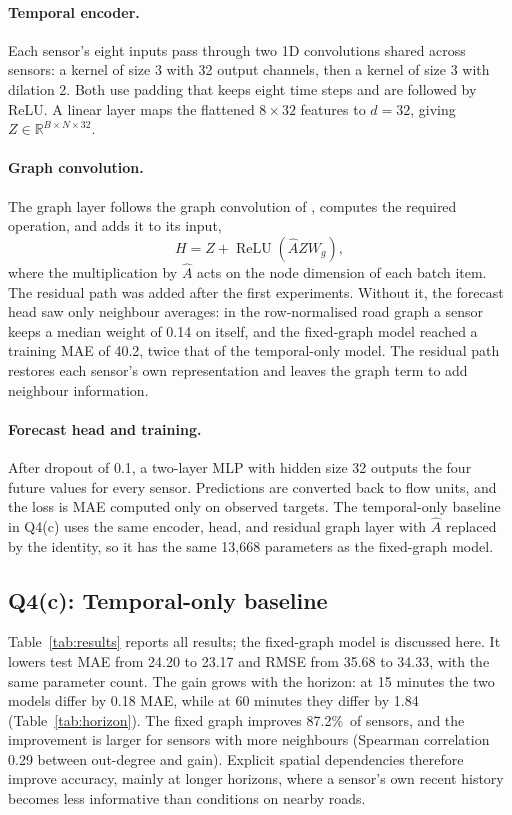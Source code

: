 \documentclass{article}
\newcommand{\pct}{\%\ }
\newcommand{\Ahat}{\ensuremath{\hat{A}}}
\begin{document}
\paragraph{Temporal encoder.}
Each sensor's eight inputs pass through two 1D convolutions shared across sensors: a kernel of size 3 with 32 output channels, then a kernel of size 3 with dilation 2. Both use padding that keeps eight time steps and are followed by ReLU. A linear layer maps the flattened $8\times32$ features to $d=32$, giving $Z\in\mathbb{R}^{B\times N\times32}$.

\paragraph{Graph convolution.}
The graph layer follows the graph convolution of \citet{kipf2017gcn}, computes the required operation, and adds it to its input,
\begin{equation}
  H=Z+\operatorname{ReLU}\!\left(\Ahat ZW_g\right),
\end{equation}
where the multiplication by $\Ahat$ acts on the node dimension of each batch item. The residual path was added after the first experiments. Without it, the forecast head saw only neighbour averages: in the row-normalised road graph a sensor keeps a median weight of 0.14 on itself, and the fixed-graph model reached a training MAE of 40.2, twice that of the temporal-only model. The residual path restores each sensor's own representation and leaves the graph term to add neighbour information.

\paragraph{Forecast head and training.}
After dropout of 0.1, a two-layer MLP with hidden size 32 outputs the four future values for every sensor. Predictions are converted back to flow units, and the loss is MAE computed only on observed targets. The temporal-only baseline in Q4(c) uses the same encoder, head, and residual graph layer with $\Ahat$ replaced by the identity, so it has the same 13,668 parameters as the fixed-graph model.

\subsection*{Q4(c): Temporal-only baseline}

Table~\ref{tab:results} reports all results; the fixed-graph model is discussed here. It lowers test MAE from 24.20 to 23.17 and RMSE from 35.68 to 34.33, with the same parameter count. The gain grows with the horizon: at 15 minutes the two models differ by 0.18 MAE, while at 60 minutes they differ by 1.84 (Table~\ref{tab:horizon}). The fixed graph improves 87.2\pct of sensors, and the improvement is larger for sensors with more neighbours (Spearman correlation 0.29 between out-degree and gain). Explicit spatial dependencies therefore improve accuracy, mainly at longer horizons, where a sensor's own recent history becomes less informative than conditions on nearby roads.
\end{document}
